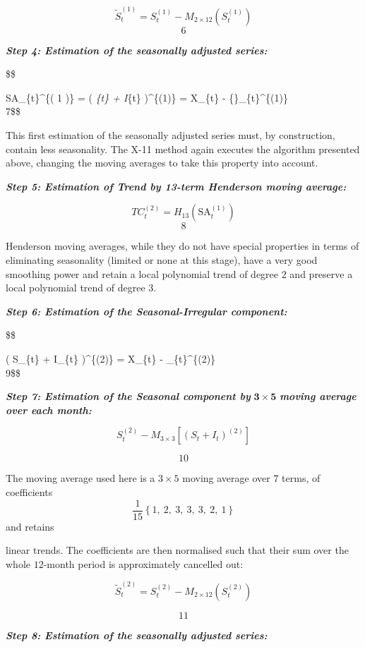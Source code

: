 \documentclass[
  letterpaper,
  DIV=11,
  numbers=noendperiod]{scrreprt}
\begin{document}
\[
   \widetilde{S}_{t}^{(1)} = S_{t}^{(1)} - M_{2 \times 12}\left( S_{t}^{(1)} \right)
  \] \[6\]

\textbf{\emph{Step 4: Estimation of the seasonally adjusted series:}}

\$\$

SA\_\{t\}\^{}\{\left( 1 \right)\} = \left( \emph{\{t\} +
I}\{t\} \right)\^{}\{(1)\} = X\_\{t\} -
\{\}\_\{t\}\^{}\{(1)\} \[ \]7\$\$

This first estimation of the seasonally adjusted series must, by
construction, contain less seasonality. The X-11 method again executes
the algorithm presented above, changing the moving averages to take this
property into account.

\textbf{\emph{Step 5: Estimation of Trend by 13-term Henderson moving
average:}}

\[
  TC_{t}^{(2)} = H_{13}\left( \text{SA}_{t}^{\left( 1 \right)} \right)
  \] \[8\]

Henderson moving averages, while they do not have special properties in
terms of eliminating seasonality (limited or none at this stage), have a
very good smoothing power and retain a local polynomial trend of degree
\(2\) and preserve a local polynomial trend of degree \(3\).

\textbf{\emph{Step 6: Estimation of the Seasonal-Irregular component:}}

\$\$

\left( S\_\{t\} + I\_\{t\} \right)\^{}\{(2)\} = X\_\{t\} -
\_\{t\}\^{}\{(2)\} \[ \]9\$\$

\textbf{\emph{Step 7: Estimation of the Seasonal component by}}
\(\mathbf{3 \times 5}\) \textbf{\emph{moving average over each month:}}

\[S_{t}^{(2)} - M_{3 \times 3}\left\lbrack \left( S_{t} + I_{t} \right)^{(2)} \right\rbrack\]

\[10\]

The moving average used here is a \(3 \times 5\) moving average over
\(7\) terms, of coefficients
\[\frac{1}{15} \left\{ 1,\ 2,\ 3,\ 3,\ 3,\ 2,\ 1 \right\}\] and retains

linear trends. The coefficients are then normalised such that their sum
over the whole \(12\)-month period is approximately cancelled out:

\[{ \widetilde{S}}_{t}^{(2)} = S_{t}^{(2)} - M_{2 \times 12}\left( S_{t}^{(2)} \right)\]

\[11\]

\textbf{\emph{Step 8: Estimation of the seasonally adjusted series:}}
\end{document}
